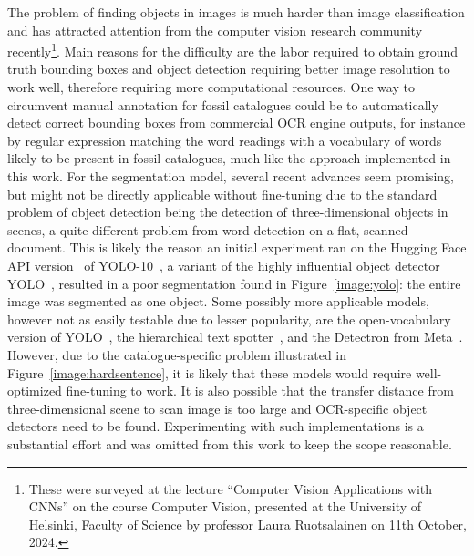 \documentclass[english,twoside,openright]{UH_DS_MSc}
\begin{document}
The problem of finding objects in images is much harder than image classification and has attracted attention 
from the computer vision research community recently\footnote{These were surveyed at the lecture ``Computer Vision Applications with CNNs'' on the course Computer Vision, presented at the University of Helsinki, Faculty of Science by professor Laura Ruotsalainen on 11th October, 2024.}. 
Main reasons for the difficulty are the labor required to obtain ground truth bounding boxes and object detection requiring better image resolution to work well, therefore requiring more computational resources.
One way to circumvent manual annotation for fossil catalogues could be to automatically detect correct bounding boxes 
from commercial OCR engine outputs, for instance by regular expression matching the word readings with a vocabulary of words likely to be 
present in fossil catalogues, much like the approach implemented in this work.
For the segmentation model, several recent advances seem promising, but might not be directly applicable without fine-tuning 
due to the standard problem of object detection being the detection of three-dimensional objects in scenes, a
quite different problem from word detection on a flat, scanned document. This is likely the reason an initial experiment 
ran on the Hugging Face API version~\cite{OmouredYOLOv10DocumentLayoutAnalysisHugging2023} of YOLO-10~\cite{wang2024yolov10}, a variant of the highly influential object detector YOLO~\cite{redmonYouOnlyLook2016},
resulted in a poor segmentation found in Figure~\ref{image:yolo}: the entire image was segmented as one object.
Some possibly more applicable models, however not as easily testable due to lesser popularity, 
are the open-vocabulary version of YOLO~\cite{YOLOWorldRealTimeOpenVocabulary},
 the hierarchical text spotter~\cite{longHierarchicalTextSpotter2024}, and the Detectron from Meta~\cite{Detectron}.
 However, due to the catalogue-specific problem illustrated in Figure~\ref{image:hardsentence}, it is likely that these 
 models would require well-optimized fine-tuning to work. It is also possible that the transfer distance from three-dimensional scene to scan image is 
 too large and OCR-specific object detectors need to be found. Experimenting with such implementations is a 
 substantial effort and was omitted from this work to keep the scope reasonable.
\end{document}
